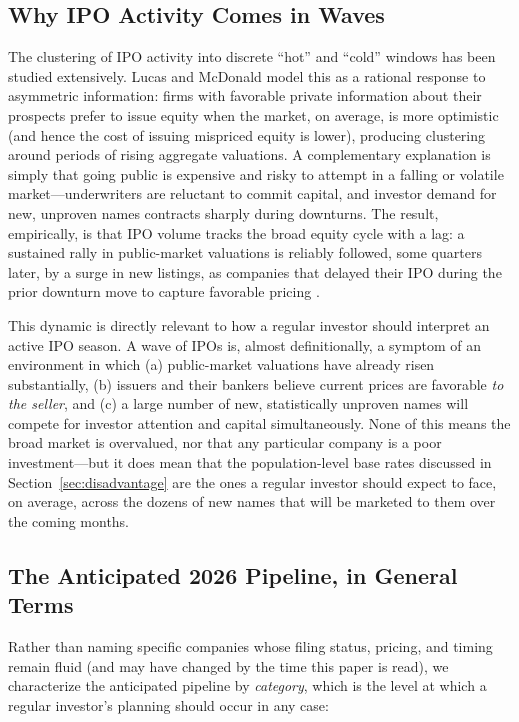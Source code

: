 \documentclass[conference]{IEEEtran}
\begin{document}
\subsection{Why IPO Activity Comes in Waves}

The clustering of IPO activity into discrete ``hot'' and ``cold'' windows has been studied extensively. Lucas and McDonald \cite{lucasmcdonald1990} model this as a rational response to asymmetric information: firms with favorable private information about their prospects prefer to issue equity when the market, on average, is more optimistic (and hence the cost of issuing mispriced equity is lower), producing clustering around periods of rising aggregate valuations. A complementary explanation is simply that going public is expensive and risky to attempt in a falling or volatile market---underwriters are reluctant to commit capital, and investor demand for new, unproven names contracts sharply during downturns. The result, empirically, is that IPO volume tracks the broad equity cycle with a lag: a sustained rally in public-market valuations is reliably followed, some quarters later, by a surge in new listings, as companies that delayed their IPO during the prior downturn move to capture favorable pricing \cite{loughranritter2004}.

This dynamic is directly relevant to how a regular investor should interpret an active IPO season. A wave of IPOs is, almost definitionally, a symptom of an environment in which (a) public-market valuations have already risen substantially, (b) issuers and their bankers believe current prices are favorable \emph{to the seller}, and (c) a large number of new, statistically unproven names will compete for investor attention and capital simultaneously. None of this means the broad market is overvalued, nor that any particular company is a poor investment---but it does mean that the population-level base rates discussed in Section~\ref{sec:disadvantage} are the ones a regular investor should expect to face, on average, across the dozens of new names that will be marketed to them over the coming months.

\subsection{The Anticipated 2026 Pipeline, in General Terms}

Rather than naming specific companies whose filing status, pricing, and timing remain fluid (and may have changed by the time this paper is read), we characterize the anticipated pipeline by \emph{category}, which is the level at which a regular investor's planning should occur in any case:
\end{document}
